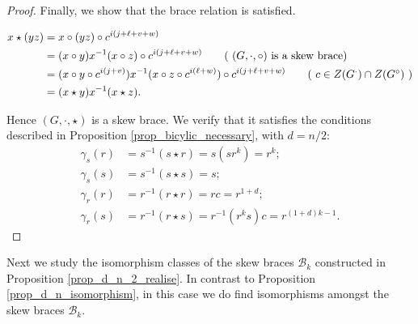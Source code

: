 \documentclass[reqno]{amsart}
\theoremstyle{definition}
\begin{document}
\begin{proof}
Finally, we show that the brace relation is satisfied.

\begin{align*}
x \star (yz) &= x \circ (yz) \circ c^{i(j+\ell+v+w)} \\
&= (x \circ y)x^{-1}(x \circ z) \circ c^{i(j+\ell+v+w)} \tag{ $ (G,\cdot,\circ) $ is a skew brace} \\
&= (x \circ y \circ c^{i(j+v)})x^{-1}(x \circ z \circ c^{i(\ell+w)}) \circ c^{i(j+\ell+v+w)}\tag{ $ c \in Z(G^{\cdot}) \cap Z(G^{\circ}) $ }\\
&= (x \star y)x^{-1}(x \star z). 
\end{align*}

Hence $ (G,\cdot,\star) $ is a skew brace. We verify that it satisfies the conditions described in Proposition \ref{prop_bicylic_necessary}, with $ d=n/2 $: 
\begin{align*}
\gamma_{s}(r) &= s^{-1}(s \star r) = s(sr^{k}) = r^{k}; \\
\gamma_{s}(s) &= s^{-1}(s \star s) = s; \\
\gamma_{r}(r) &= r^{-1}(r \star r) = rc = r^{1 + d}; \\
\gamma_{r}(s) &= r^{-1}(r \star s) = r^{-1}(r^{k}s)c = r^{(1+d)k-1}.
\end{align*}
\end{proof}

Next we study the isomorphism classes of the skew braces $ \mathscr{B}_{k} $ constructed in Proposition \ref{prop_d_n_2_realise}. In contrast to Proposition \ref{prop_d_n_isomorphism}, in this case we do find isomorphisms  amongst the skew braces $ \mathscr{B}_{k} $.
\end{document}
